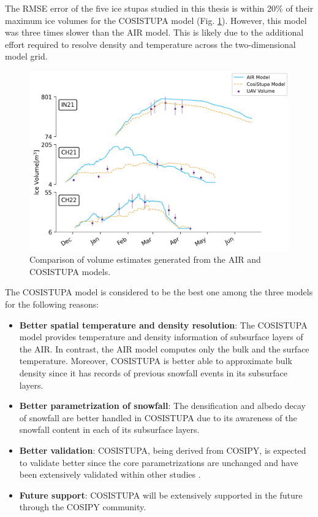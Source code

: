 The \ac{RMSE} error of the five ice stupas studied in this thesis is within 20\% of their maximum ice volumes
for the COSISTUPA model (Fig. \ref{fig:Cosistupa}).  However, this model was three times slower than the AIR model.
This is likely due to the additional effort required to resolve density and temperature across the two-dimensional model grid.

\begin{figure}[t]
	\centering
	\includegraphics[width=\textwidth]{figs/model_compare.jpg}

	\caption{Comparison of volume estimates generated from the AIR and COSISTUPA models.}

	\label{fig:Cosistupa}
\end{figure}

The COSISTUPA model is considered to be the best one among the three models for the following reasons:

\begin{itemize}

	\item \textbf{Better spatial temperature and density resolution}: The COSISTUPA model provides temperature and density
	      information of subsurface layers of the AIR. In contrast, the AIR model computes only the bulk and the
	      surface temperature. Moreover, COSISTUPA is better able to approximate bulk density since it has records of
	      previous snowfall events in its subsurface layers.

	\item \textbf{Better parametrization of snowfall}: The densification and albedo decay of snowfall are better
	      handled in COSISTUPA due to its awareness of the snowfall content in each of its subsurface layers.

	\item \textbf{Better validation}: COSISTUPA, being derived from COSIPY, is expected to validate better
	      since the core parametrizations are unchanged and have been extensively validated within other studies \citep{arndtAtmosphereDrivenMassBalance2021}.

	\item \textbf{Future support}: COSISTUPA will be extensively supported in the future through the COSIPY
	      community.

\end{itemize}


